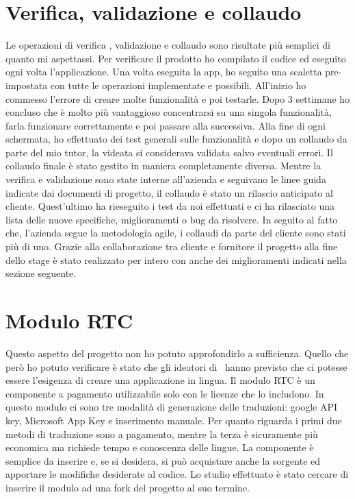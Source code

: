 \section{Verifica, validazione e collaudo}
Le operazioni di verifica , validazione e collaudo sono risultate più semplici di quanto mi aspettassi. Per verificare il prodotto ho compilato il codice ed eseguito ogni volta l'applicazione. 
Una volta eseguita la app, ho seguito una scaletta pre-impostata con tutte le operazioni implementate e possibili. All'inizio ho commesso l'errore di creare molte funzionalità e poi testarle. Dopo 3 settimane ho concluso che è molto più vantaggioso concentrarsi su una singola funzionalità, farla funzionare correttamente e poi passare alla successiva.
Alla fine di ogni schermata, ho effettuato dei test generali sulle funzionalità e dopo un collaudo da parte del mio tutor, la videata  si considerava validata salvo eventuali errori.  
Il collaudo finale è stato gestito in maniera completamente diversa. Mentre la verifica e validazione sono state interne all'azienda e seguivano le linee guida indicate dai documenti di progetto, il collaudo è stato un rilascio anticipato al cliente. Quest'ultimo ha rieseguito i test da noi effettuati e ci ha rilasciato una lista delle nuove specifiche, miglioramenti o bug da risolvere. 
In seguito al fatto che, l'azienda segue la metodologia agile, i collaudi da parte del cliente sono stati più di uno. Grazie alla collaborazione tra cliente e fornitore il progetto alla fine dello stage è stato realizzato per intero con anche dei miglioramenti indicati nella sezione seguente.

\section{Modulo RTC}
Questo aspetto del progetto non ho potuto approfondirlo a sufficienza. Quello che però ho potuto verificare è stato che gli ideatori di \inde\ hanno previsto che ci potesse essere l'esigenza di creare una applicazione in lingua.
Il modulo RTC è un componente a pagamento utilizzabile solo con le licenze che lo includono. In questo modulo ci sono tre modalità di generazione delle traduzioni: google API key, Microsoft App Key e inserimento manuale. 
Per quanto riguarda i primi due metodi di traduzione sono a pagamento, mentre la terza è sicuramente più economica ma richiede tempo e conoscenza delle lingue.
La componente è semplice da inserire e, se si desidera, si può acquistare anche la sorgente ed apportare le modifiche desiderate al codice.
Lo studio effettuato è stato cercare di inserire il modulo ad una fork del progetto al suo termine.
 
